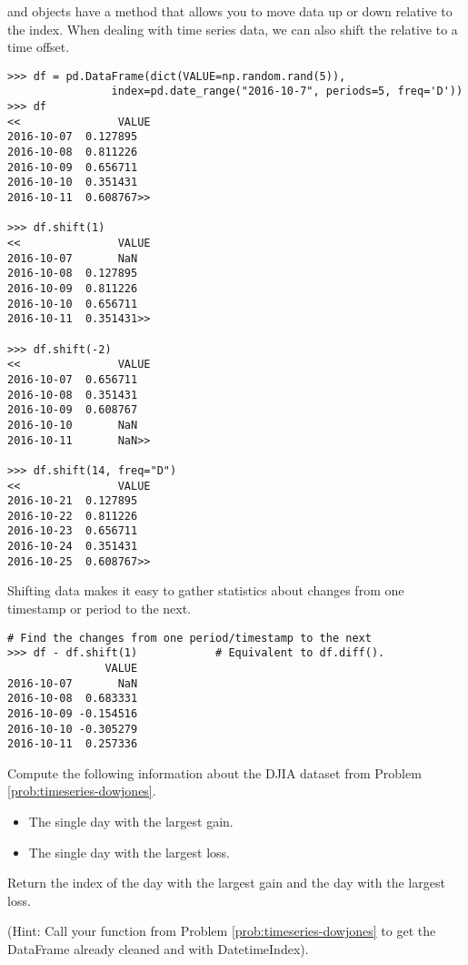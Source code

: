  and  objects have a  method that allows you to move data up or down relative to the index.
When dealing with time series data, we can also shift the  relative to a time offset.

\begin{lstlisting}
>>> df = pd.DataFrame(dict(VALUE=np.random.rand(5)),
                index=pd.date_range("2016-10-7", periods=5, freq='D'))
>>> df
<<               VALUE
2016-10-07  0.127895
2016-10-08  0.811226
2016-10-09  0.656711
2016-10-10  0.351431
2016-10-11  0.608767>>

>>> df.shift(1)
<<               VALUE
2016-10-07       NaN
2016-10-08  0.127895
2016-10-09  0.811226
2016-10-10  0.656711
2016-10-11  0.351431>>

>>> df.shift(-2)
<<               VALUE
2016-10-07  0.656711
2016-10-08  0.351431
2016-10-09  0.608767
2016-10-10       NaN
2016-10-11       NaN>>

>>> df.shift(14, freq="D")
<<               VALUE
2016-10-21  0.127895
2016-10-22  0.811226
2016-10-23  0.656711
2016-10-24  0.351431
2016-10-25  0.608767>>
\end{lstlisting}

Shifting data makes it easy to gather statistics about changes from one timestamp or period to the next.

\begin{lstlisting}
# Find the changes from one period/timestamp to the next
>>> df - df.shift(1)            # Equivalent to df.diff().
               VALUE
2016-10-07       NaN
2016-10-08  0.683331
2016-10-09 -0.154516
2016-10-10 -0.305279
2016-10-11  0.257336
\end{lstlisting}

\begin{problem}
Compute the following information about the DJIA dataset from Problem \ref{prob:timeseries-dowjones}.
\begin{itemize}
    \item The single day with the largest gain.
    \item The single day with the largest loss.
\end{itemize}
Return the index of the day with the largest gain and the day with the largest loss.

(Hint: Call your function from Problem \ref{prob:timeseries-dowjones} to get the DataFrame already cleaned and with DatetimeIndex).
\end{problem}

